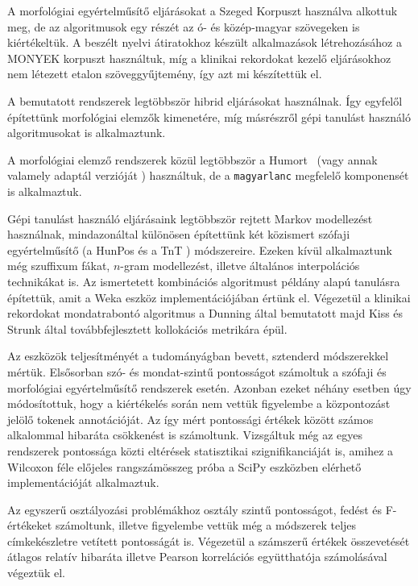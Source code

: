 A morfológiai egyértelműsítő eljárásokat a Szeged Korpuszt \cite{Csendes2004} használva alkottuk meg, de az algoritmusok egy részét az ó- és közép-magyar szövegeken \cite{Novak2013} is kiértékeltük.
A beszélt nyelvi átiratokhoz készült alkalmazások létrehozásához a MONYEK korpuszt \cite{Matyus2014} használtuk, míg a klinikai rekordokat kezelő eljárásokhoz nem létezett etalon szöveggyűjtemény, így azt mi készítettük el.

A bemutatott rendszerek legtöbbször hibrid eljárásokat használnak. 
Így egyfelől építettünk morfológiai elemzők kimenetére, míg másrészről gépi tanulást használó algoritmusokat is alkalmaztunk.

A morfológiai elemző rendszerek közül legtöbbször a Humort~\cite{Proszeky1994,Novak2003,Proszeky2005} (vagy annak valamely adaptál verzióját \cite{Novak2013,NovakOMK,Orosz2013}) használtuk, de a \texttt{magyarlanc} \cite{zsibrata2013magyarlanc} megfelelő komponensét is alkalmaztuk. 

Gépi tanulást használó eljárásaink legtöbbször rejtett Markov modellezést \cite{Rabiner1989,Samuelsson1993}  használnak, mindazonáltal különösen építettünk két közismert szófaji egyértelműsítő (a HunPos  \cite{Halacsy2007} és a TnT \cite{Brants2000}) módszereire.
Ezeken kívül alkalmaztunk még szuffixum fákat, $n$-gram modellezést, illetve általános interpolációs technikákat is.
Az ismertetett kombinációs algoritmust példány alapú tanulásra \cite{Aha1991} építettük, amit a Weka \cite{Hall2009} eszköz implementációjában értünk el.
Végezetül a klinikai rekordokat mondatrabontó algoritmus a Dunning által bemutatott \cite{dunning1993accurate} majd Kiss és Strunk által továbbfejlesztett \cite{kiss2006unsupervised} kollokációs metrikára épül.

Az eszközök teljesítményét a tudományágban bevett, sztenderd módszerekkel mértük.
Elsősorban szó- és mondat-szintű pontosságot számoltuk a szófaji és morfológiai egyértelműsítő rendszerek esetén.
Azonban ezeket néhány esetben úgy módosítottuk, hogy a kiértékelés során nem vettük figyelembe a központozást jelölő tokenek annotációját.
Az így mért pontossági értékek között számos alkalommal hibaráta csökkenést is számoltunk.
Vizsgáltuk még az egyes rendszerek pontossága közti eltérések statisztikai szignifikanciáját is, amihez a Wilcoxon féle előjeles rangszámösszeg próba a SciPy \cite{scipy} eszközben elérhető implementációját alkalmaztuk.

Az egyszerű osztályozási problémákhoz osztály szintű pontosságot, fedést és F-értékeket számoltunk, illetve figyelembe vettük még a módszerek teljes címkekészletre vetített pontosságát is.
Végezetül a számszerű értékek összevetését átlagos relatív hibaráta \cite{Witten2011} illetve
Pearson korrelációs együtthatója \cite{Witten2011} számolásával végeztük el.